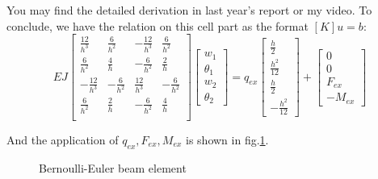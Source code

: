 You may find the detailed derivation in last year's report or my video.
To conclude, 
we have the relation on this cell part as the format $[K]u=b$:
\begin{equation}
    EJ
    \begin{bmatrix}
        \frac{12}{h^3} & \frac{6}{h^2} & -\frac{12}{h^3} & \frac{6}{h^2} \\
        \frac{6}{h^2} & \frac{4}{h} & -\frac{6}{h^2} & \frac{2}{h} \\
        -\frac{12}{h^3} & -\frac{6}{h^2} & \frac{12}{h^3} & -\frac{6}{h^2} \\
        \frac{6}{h^2} & \frac{2}{h} & -\frac{6}{h^2} & \frac{4}{h} \\
       \end{bmatrix}
       \begin{bmatrix}
           w_1\\ \theta_1\\ w_2\\ \theta_2
       \end{bmatrix}
       =
       q_{ex}
       \begin{bmatrix}
        \frac{h}{2}\\
        \frac{h^2}{12}\\
        \frac{h}{2}\\
        -\frac{h^2}{12}
        \end{bmatrix}
        +
        \begin{bmatrix}
            0\\
            0\\
            F_{ex}\\
            -M_{ex}
        \end{bmatrix}
\end{equation}

And the application of $q_{ex}, F_{ex}, M_{ex}$ is shown in fig.\ref{Bernoulli-Euler beam element}.

\begin{figure}[H]
    \centering
    \caption{Bernoulli-Euler beam element}
    \label{Bernoulli-Euler beam element}
\end{figure}

